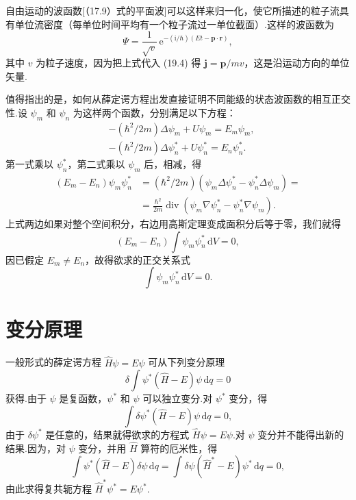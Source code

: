 自由运动的波函数[（17.9）式的平面波]可以这样来归一化，使它所描述的粒子流具有单位流密度（每单位时间平均有一个粒子流过一单位截面）.这样的波函数为
\begin{equation}
  \varPsi=\frac{1}{\sqrt{v}}\,
  \mathrm{e}^{-(\mathrm{i}/\hbar)\left(Et-\boldsymbol{p}\cdot\boldsymbol{r}\right)},
\end{equation}
其中 $v$ 为粒子速度，因为把上式代入 (19.4) 得 $\boldsymbol{j}=\boldsymbol{p}/mv$，这是沿运动方向的单位矢量.

值得指出的是，如何从薛定谔方程出发直接证明不同能级的状态波函数的相互正交性.设 $\psi_m$ 和 $\psi_n$ 为这样两个函数，分别满足以下方程：
\begin{equation*}
\begin{aligned}
  &-\left(\hbar^2/2m\right)\Delta\psi_m+U\psi_m=E_m\psi_m,\\
  &-\left(\hbar^2/2m\right)\Delta\psi_n^*+U\psi_n^*=E_n\psi_n^*.
\end{aligned}
\end{equation*}
第一式乘以 $\psi_n^*$，第二式乘以 $\psi_m$ 后，相减，得
\begin{equation*}
\begin{aligned}
  \left(E_m-E_n\right)\psi_m\psi_n^*
  &=\left(\hbar^2/2m\right)
  \left(\psi_m\Delta\psi_n^*-\psi_n^*\Delta\psi_m\right)=\\
  &=\frac{\hbar^2}{2m}\operatorname{div}
  \left(\psi_m\nabla\psi_n^*-\psi_n^*\nabla\psi_m\right).
\end{aligned}
\end{equation*}
上式两边如果对整个空间积分，右边用高斯定理变成面积分后等于零，我们就得
\begin{equation*}
  \left(E_m-E_n\right)\int\psi_m\psi_n^*\,\mathrm{d}V=0,
\end{equation*}
因已假定 $E_m\neq E_n$，故得欲求的正交关系式
\begin{equation*}
  \int\psi_m\psi_n^*\,\mathrm{d}V=0.
\end{equation*}

\section{变分原理}

一般形式的薛定谔方程 $\hat{H}\psi=E\psi$ 可从下列变分原理
\begin{equation}
  \delta\int\psi^*\left(\hat{H}-E\right)\psi\,\mathrm{d}q=0
\end{equation}
获得.由于 $\psi$ 是复函数，$\psi^*$ 和 $\psi$ 可以独立变分.对 $\psi^*$ 变分，得
\begin{equation*}
  \int\delta\psi^*\left(\hat{H}-E\right)\psi\,\mathrm{d}q=0,
\end{equation*}
由于 $\delta\psi^*$ 是任意的，结果就得欲求的方程式 $\hat{H}\psi=E\psi$.对 $\psi$ 变分并不能得出新的结果.因为，对 $\psi$ 变分，并用 $\hat{H}$ 算符的厄米性，得
\begin{equation*}
  \int\psi^*\left(\hat{H}-E\right)\delta\psi\,\mathrm{d}q
  =\int\delta\psi\left(\hat{H}^*-E\right)\psi^*\,\mathrm{d}q=0,
\end{equation*}
由此求得复共轭方程 $\hat{H}^*\psi^*=E\psi^*$.

